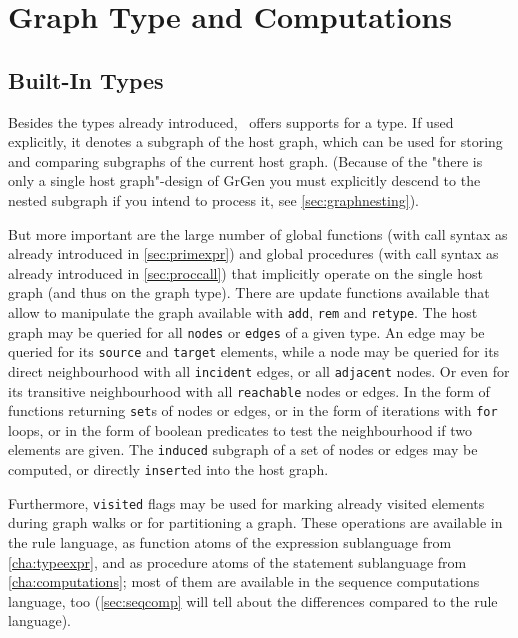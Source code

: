 \chapter{Graph Type and Computations}
\label{cha:graph}


\section{Built-In Types}
\label{sec:builtingenerictypes}
Besides the types already introduced, \GrG\ offers supports for a \texttt{} type.
If used explicitly, it denotes a subgraph of the host graph, which can be used for storing and comparing subgraphs of the current host graph. (Because of the "there is only a single host graph"-design of GrGen you must explicitly descend to the nested subgraph if you intend to process it, see \ref{sec:graphnesting}).

But more important are the large number of global functions (with call syntax as already introduced in \ref{sec:primexpr}) and global procedures (with call syntax as already introduced in \ref{sec:proccall}) that implicitly operate on the single host graph (and thus on the graph type).
There are update functions available that allow to manipulate the graph available with \texttt{add}, \texttt{rem} and \texttt{retype}.
The host graph may be queried for all \texttt{nodes} or \texttt{edges} of a given type.
An edge may be queried for its \texttt{source} and \texttt{target} elements,
while a node may be queried for its direct neighbourhood with all \texttt{incident} edges, or all \texttt{adjacent} nodes.
Or even for its transitive neighbourhood with all \texttt{reachable} nodes or edges.
In the form of functions returning \texttt{set}s of nodes or edges, or in the form of iterations with \texttt{for} loops, or in the form of boolean predicates to test the neighbourhood if two elements are given.
The \texttt{induced} subgraph of a set of nodes or edges may be computed, or directly \texttt{insert}ed into the host graph.

Furthermore, \texttt{visited} flags may be used for marking already visited elements during graph walks or for partitioning a graph.
These operations are available in the rule language, as function atoms of the expression sublanguage from \ref{cha:typeexpr}, and as procedure atoms of the statement sublanguage from \ref{cha:computations}; 
most of them are available in the sequence computations language, too
(\ref{sec:seqcomp} will tell about the differences compared to the rule language).

